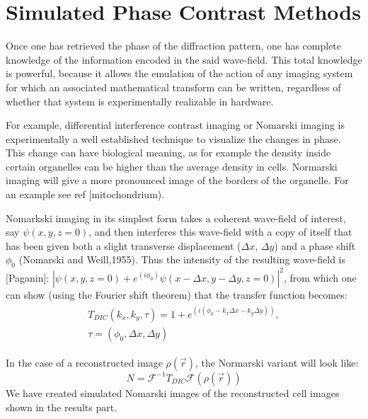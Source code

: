  
\section{Simulated Phase Contrast Methods}
Once one has retrieved the phase of the diffraction pattern, one has complete knowledge of the information encoded in the said wave-field. This total knowledge is powerful, because it allows the emulation of the action of any imaging system for which an associated mathematical transform can be written, regardless of whether that system is experimentally realizable in hardware.

For example, differential interference contrast imaging or Nomarski imaging is experimentally a well established technique to visualize the changes in phase. This change can have biological meaning, as for example the density inside certain organelles can be higher than the average density in cells. Normarski imaging will give a more pronounced image of the borders of the organelle. For an example see ref [mitochondrium). 

Nomarkski imaging in its simplest form takes a coherent wave-field of interest, say $\psi(x,y,z = 0)$, and then interferes this wave-field with a copy of itself that has been given both a slight transverse displacement ($\Delta x$, $\Delta y$) and a phase shift $\phi_0$ (Nomarski and Weill,1955). Thus the intensity of the resulting wave-field is [Paganin]:
$|\psi(x,y,z=0)+ e^{(i\phi_0)} \psi(x - \Delta x,y - \Delta y,z=0) |^2$, from which one can show (using the Fourier shift theorem) that the transfer function becomes:
\begin{equation}
\begin{aligned}
\begin{split}
T_{DIC}(k_x, k_y, \tau) = 1 + e^{(i(\phi_0 - k_x \Delta x - k_y \Delta y))},\\
\tau = (\phi_0, \Delta x, \Delta y)
\end{split}
\end{aligned}
\end{equation}

In the case of a reconstructed image $\rho(\vec{r})$, the Normarski variant will look like:
\begin{equation}
N = \mathcal{F}^{-1} T_{DIC} \mathcal{F}(\rho(\vec{r}))
\end{equation}
We have created simulated Nomarski images of the reconstructed cell images shown in the results part.

